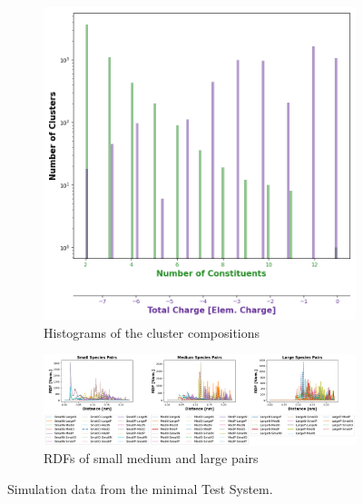 \documentclass[draft, english]{volcanica-template}
\begin{document}
\begin{figure}[!htbp]
\begin{figure}[!htbp]
\centering
\includegraphics[width=0.7\linewidth]{files/Cluster_Histogram_Fi-9b93f66650485f4fdd42ad84adbe8045.png}
\caption[]{Histograms of the cluster compositions}
\label{Fig6_TestSys-c}
\end{figure}

\begin{figure}[!htbp]
\centering
\includegraphics[width=0.7\linewidth]{files/Pairwise_RDFs_ij-7b14aca6dab3c87a778547ca8e6e6725.png}
\caption[]{RDFs of small medium and large pairs}
\label{Fig6_TestSys-d}
\end{figure}
\caption[]{Simulation data from the minimal Test System.}
\label{Fig6_TestSys-d}
\end{figure}
\end{document}

